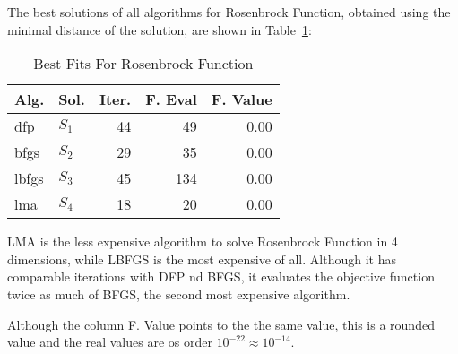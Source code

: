 
The best solutions of all algorithms for Rosenbrock Function, obtained using the minimal
distance of the solution, are shown in Table~\ref{solutions:rosenbrock4d}:

\begin{table}[H]
\centering
\caption{Best Fits For Rosenbrock Function}
\label{solutions:rosenbrock4d}
\begin{tabular}{llrrr}
\toprule
 Alg. &    Sol. &  Iter. &  F. Eval &  F. Value \\
\midrule
  dfp & $S_{1}$ &     44 &       49 &      0.00 \\
 bfgs & $S_{2}$ &     29 &       35 &      0.00 \\
lbfgs & $S_{3}$ &     45 &      134 &      0.00 \\
  lma & $S_{4}$ &     18 &       20 &      0.00 \\
\bottomrule
\end{tabular}
\end{table}

LMA is the less expensive algorithm to solve Rosenbrock Function in 4 dimensions, while LBFGS
is the most expensive of all. Although it has comparable iterations with DFP nd BFGS, it evaluates
the objective function twice as much of BFGS, the second most expensive algorithm.

Although the column F. Value points to the the same value, this is a rounded value
and the real values are os order $10^{-22} \approx 10^{-14}$.
